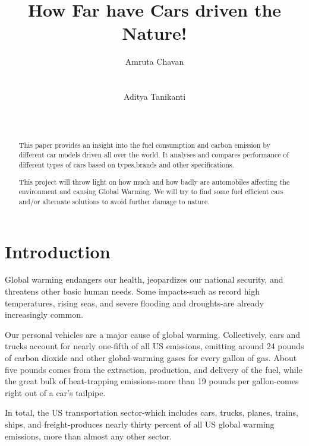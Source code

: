 \documentclass{acm_proc_article-sp}
\begin{document}
\title{How Far have Cars driven the Nature!}

\author{
\alignauthor
Amruta Chavan\\
       \\
       \\
\alignauthor
Aditya Tanikanti\\
       \\
       \\
}
\toappear{}
\maketitle
\begin{abstract}
This paper provides an insight into the fuel consumption and carbon emission by different car models driven all over the world. It analyses and compares performance of different types of cars based on types,brands and other specifications.

This project will throw light on how much and how badly are automobiles affecting the environment and causing Global Warming. We will try to find some fuel efficient cars and/or alternate solutions to avoid further damage to nature. 
\end{abstract}

\section{Introduction}
Global warming endangers our health, jeopardizes our national security, and threatens other basic human needs. Some impacts-such as record high temperatures, rising seas, and severe flooding and droughts-are already increasingly common.

Our personal vehicles are a major cause of global warming. Collectively, cars and trucks account for nearly one-fifth of all US emissions, emitting around 24 pounds of carbon dioxide and other global-warming gases for every gallon of gas. About five pounds comes from the extraction, production, and delivery of the fuel, while the great bulk of heat-trapping emissions-more than 19 pounds per gallon-comes right out of a car's tailpipe.

In total, the US transportation sector-which includes cars, trucks, planes, trains, ships, and freight-produces nearly thirty percent of all US global warming emissions, more than almost any other sector.
\end{document}
